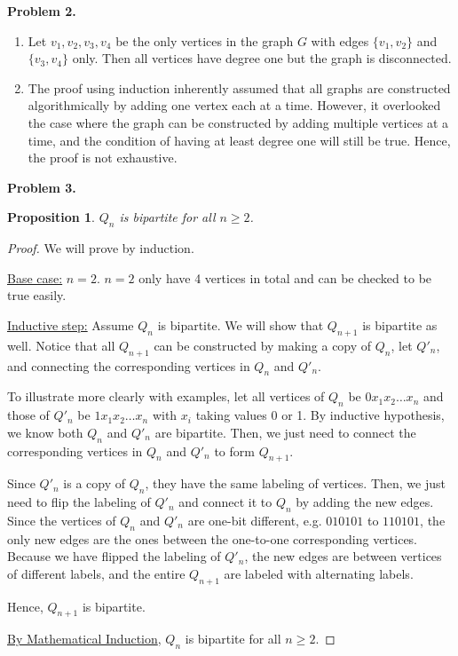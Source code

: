 \documentclass{article}
\newtheorem{prop}[thm]{Proposition}
\begin{document}
\textbf{Problem 2.}
\begin{enumerate}[label=(\alph*)]
    \item Let $v_1, v_2, v_3, v_4$ be the only vertices in the graph $G$ with edges $\{v_1, v_2\}$ and $\{v_3, v_4\}$ only.
    Then all vertices have degree one but the graph is disconnected.

    \item
    The proof using induction inherently assumed that all graphs are constructed algorithmically by adding one vertex each at a time. 
    However, it overlooked the case where the graph can be constructed by adding multiple vertices at a time, and the condition of having at least degree one will still be true.
    Hence, the proof is not exhaustive.
\end{enumerate}
\bigbreak

\textbf{Problem 3.}

\begin{prop}
    $Q_n$ is bipartite for all $n \geq 2$.
\end{prop}
\begin{proof}
    We will prove by induction.

    \underline{Base case:} $n = 2$. $n=2$ only have 4 vertices in total and can be checked to be true easily.

    \underline{Inductive step:} Assume $Q_n$ is bipartite. We will show that $Q_{n+1}$ is bipartite as well.
    Notice that all $Q_{n+1}$ can be constructed by making a copy of $Q_n$, let $Q'_n$, and connecting the corresponding vertices in $Q_n$ and $Q'_n$.

    To illustrate more clearly with examples, let all vertices of $Q_n$ be $0x_1x_2\dots x_n$ and those of $Q'_n$ be $1x_1x_2\dots x_n$ with $x_i$ taking values 0 or 1.
    By inductive hypothesis, we know both $Q_n$ and $Q'_n$ are bipartite. Then, we just need to connect the corresponding vertices in $Q_n$ and $Q'_n$ to form $Q_{n+1}$.

    Since $Q'_n$ is a copy of $Q_n$, they have the same labeling of vertices. 
    Then, we just need to flip the labeling of $Q'_n$ and connect it to $Q_n$ by adding the new edges. 
    Since the vertices of $Q_n$ and $Q'_n$ are one-bit different, e.g. $010101$ to $110101$, the only new edges are the ones between the one-to-one corresponding vertices.
    Because we have flipped the labeling of $Q'_n$, the new edges are between vertices of different labels, and the entire $Q_{n+1}$ are labeled with alternating labels.

    Hence, $Q_{n+1}$ is bipartite.

    \underline{By Mathematical Induction}, $Q_n$ is bipartite for all $n \geq 2$.
\end{proof}
\bigbreak
\end{document}
